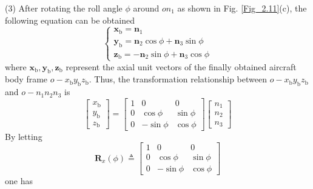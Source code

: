 (3) After rotating the roll angle $\phi$ around $o{{n}_{1}}$ as
shown in Fig. \ref{Fig_2.11}(c), the following equation can be obtained
\begin{equation}
\left\{ \begin{array}{l}
{{\mathbf{x}}_{\text{b}}}={{\mathbf{n}}_{1}}\\
{{\mathbf{y}}_{\text{b}}}={{\mathbf{n}}_{2}}\cos\phi+{{\mathbf{n}}_{3}}\sin\phi\\
{{\mathbf{z}}_{\text{b}}}=-{{\mathbf{n}}_{2}}\sin\phi+{{\mathbf{n}}_{3}}\cos\phi
\end{array}\right.\label{eq:2.9}
\end{equation}
where ${\mathbf{x}}_{\text{b}},{\mathbf{y}}_{\text{b}},{\mathbf{z}}_{\text{b}}$
represent the axial unit vectors of the finally obtained aircraft
body frame $o-{{x}_{\text{b}}}{{y}_{\text{b}}}{{z}_{\text{b}}}$.
Thus, the transformation relationship between $o-{{x}_{\text{b}}}{{y}_{\text{b}}}{{z}_{\text{b}}}$
and $o-{{n}_{1}}{{n}_{2}}{{n}_{3}}$ is
\begin{equation}
\left[\begin{array}{l}
{x_{\text{b}}}\\
{y_{\text{b}}}\\
{z_{\text{b}}}
\end{array}\right]=\left[{\begin{array}{ccc}
	1 & 0 & 0\\
	0 & {\cos\phi} & {\sin\phi}\\
	0 & {-\sin\phi} & {\cos\phi}
	\end{array}}\right]\left[{\begin{array}{c}
	{n_{1}}\\
	{n_{2}}\\
	{n_{3}}
	\end{array}}\right]\label{eq:2.10}
\end{equation}
By letting
\begin{equation}
{{\mathbf{R}}_{x}}\left(\phi\right)\triangleq\left[\begin{array}{ccc}
1 & 0 & 0\\
0 & \cos\phi & \sin\phi\\
0 & -\sin\phi & \cos\phi
\end{array}\right]\label{eq:2.11}
\end{equation}
one has
